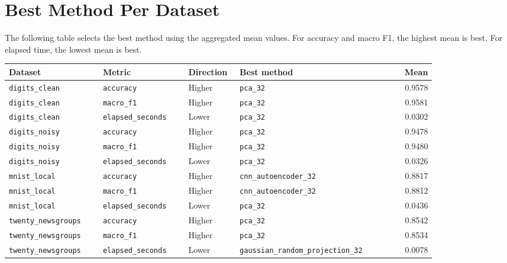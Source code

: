 \documentclass[11pt]{article}
\begin{document}
\section{Best Method Per Dataset}

The following table selects the best method using the aggregated mean values.
For accuracy and macro F1, the highest mean is best. For elapsed time, the
lowest mean is best.

\begin{longtable}{p{0.22\linewidth} p{0.20\linewidth} p{0.12\linewidth} p{0.30\linewidth} r}
\toprule
\textbf{Dataset} & \textbf{Metric} & \textbf{Direction} & \textbf{Best method} & \textbf{Mean} \\
\midrule
\endhead

\texttt{digits\_clean} & \texttt{accuracy} & Higher & \texttt{pca\_32} & 0.9578 \\
\texttt{digits\_clean} & \texttt{macro\_f1} & Higher & \texttt{pca\_32} & 0.9581 \\
\texttt{digits\_clean} & \texttt{elapsed\_seconds} & Lower & \texttt{pca\_32} & 0.0302 \\
\addlinespace

\texttt{digits\_noisy} & \texttt{accuracy} & Higher & \texttt{pca\_32} & 0.9478 \\
\texttt{digits\_noisy} & \texttt{macro\_f1} & Higher & \texttt{pca\_32} & 0.9480 \\
\texttt{digits\_noisy} & \texttt{elapsed\_seconds} & Lower & \texttt{pca\_32} & 0.0326 \\
\addlinespace

\texttt{mnist\_local} & \texttt{accuracy} & Higher & \texttt{cnn\_autoencoder\_32} & 0.8817 \\
\texttt{mnist\_local} & \texttt{macro\_f1} & Higher & \texttt{cnn\_autoencoder\_32} & 0.8812 \\
\texttt{mnist\_local} & \texttt{elapsed\_seconds} & Lower & \texttt{pca\_32} & 0.0436 \\
\addlinespace

\texttt{twenty\_newsgroups} & \texttt{accuracy} & Higher & \texttt{pca\_32} & 0.8542 \\
\texttt{twenty\_newsgroups} & \texttt{macro\_f1} & Higher & \texttt{pca\_32} & 0.8534 \\
\texttt{twenty\_newsgroups} & \texttt{elapsed\_seconds} & Lower & \texttt{gaussian\_random\_projection\_32} & 0.0078 \\

\bottomrule
\end{longtable}
\end{document}
